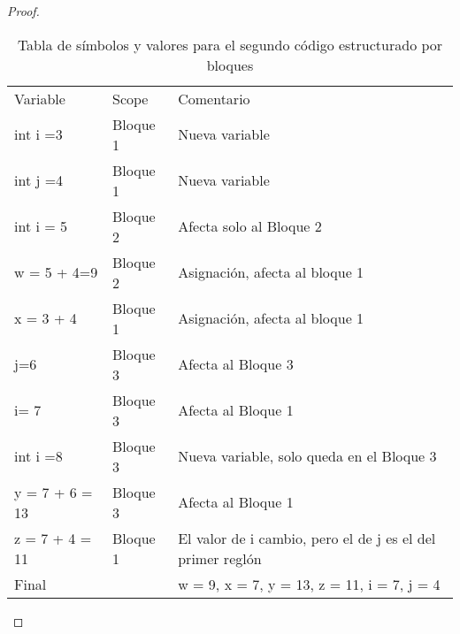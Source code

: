 \begin{proof}
\begin{table}[h!]
\centering
\begin{tabular}{lll}
Variable                    & Scope    & Comentario                                                 \\
int i =3                    & Bloque 1 & Nueva variable                                             \\
int j =4                    & Bloque 1 & Nueva variable                                             \\
int i = 5                   & Bloque 2 & Afecta solo al Bloque 2                                   \\
w = 5 + 4=9                 & Bloque 2 & Asignación, afecta al bloque 1                             \\ 
x = 3 + 4                   & Bloque 1 & Asignación, afecta al bloque 1                             \\ 
j=6                         & Bloque 3 & Afecta al Bloque 3                                         \\
i= 7                        & Bloque 3 & Afecta al Bloque 1                                         \\
int i =8                    & Bloque 3 & Nueva variable, solo queda en el Bloque 3                  \\
y = 7 + 6 = 13              & Bloque 3 & Afecta al Bloque 1                                         \\
z = 7 + 4 = 11              & Bloque 1 & El valor de i cambio, pero el de j es el del primer reglón \\
Final                       &          & w = 9, x = 7, y = 13, z = 11, i = 7, j = 4                            
\end{tabular}
\caption{Tabla de símbolos y valores para el segundo código estructurado por bloques}
\end{table}
\end{proof}
